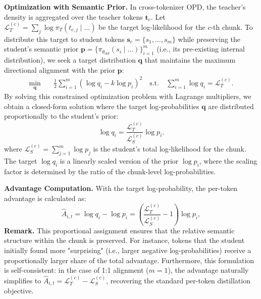 \documentclass{article}
\theoremstyle{plain}
\theoremstyle{definition}
\theoremstyle{remark}
\begin{document}
\textbf{Optimization with Semantic Prior.} In cross-tokenizer OPD, the teacher's density is aggregated over the teacher tokens $\bm{t}_c$. Let $\mathcal{L}_T^{(c)} = \sum_{j} \log \pi_T(t_{c,j} \mid \dots)$ be the target log-likelihood for the $c$-th chunk. To distribute this target to student tokens $\bm{s}_c = \{s_1, \dots, s_m\}$ while preserving the student's semantic prior $\bm{p} = \{ \pi_{\theta_{\text{old}}}(s_i \mid \dots) \}_{i=1}^m$ (i.e., its pre-existing internal distribution), we seek a target distribution $\bm{q}$ that maintains the maximum directional alignment with the prior $\bm{p}$:
\begin{equation}
\begin{aligned}
\min_{\bm{q}} \quad & \frac{1}{2} \sum_{i=1}^m \left( \log q_i - k \log p_i \right)^2 \quad
\text{s.t.} \ & \sum_{i=1}^m \log q_i = \mathcal{L}_T^{(c)}.
\end{aligned}
\end{equation}
By solving this constrained optimization problem with Lagrange multipliers, we obtain a closed-form solution where the target log-probabilities $\bm{q}$ are distributed proportionally to the student's prior:
\begin{equation}
\log q_i = \frac{\mathcal{L}_T^{(c)}}{\mathcal{L}_S^{(c)}}  \log p_i .
\end{equation}
where $\mathcal{L}_S^{(c)} = \sum_{j=1}^m \log p_j$ is the student's total log-likelihood for the chunk. The target $\log q_i$ is a linearly scaled version of the prior $\log p_i$, where the scaling factor is determined by the ratio of the chunk-level log-probabilities.

\textbf{Advantage Computation.} With the target log-probability, the per-token advantage is calculated as:
\begin{equation}\label{esadv}
\hat{A}_{i,t} = \log q_i - \log p_i = \left( \frac{\mathcal{L}_T^{(c)}}{\mathcal{L}_S^{(c)}} - 1 \right) \log p_i,
\end{equation}
\textbf{Remark.} This proportional assignment ensures that the relative semantic structure within the chunk is preserved. For instance, tokens that the student initially found more "surprising" (i.e., larger negative log-probabilities) receive a proportionally larger share of the total advantage. Furthermore, this formulation is self-consistent: in the case of 1:1 alignment ($m=1$), the advantage naturally simplifies to $\hat{A}_{i,t} = \mathcal{L}_T^{(c)} - \mathcal{L}_S^{(c)}$, recovering the standard per-token distillation objective. 
\end{document}
